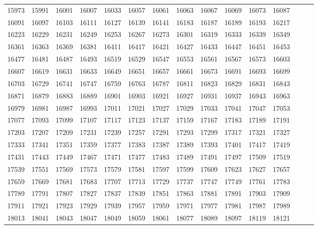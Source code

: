 \documentclass[10pt, a4paper]{article}
\begin{document}
\begin{center}
\begin{longtable}{c c c c c c c c c c c c c c c}
        15973 & 15991 & 16001 & 16007 & 16033 & 16057 & 16061 & 16063 & 16067 & 16069 & 16073 & 16087 \\
        16091 & 16097 & 16103 & 16111 & 16127 & 16139 & 16141 & 16183 & 16187 & 16189 & 16193 & 16217 \\
        16223 & 16229 & 16231 & 16249 & 16253 & 16267 & 16273 & 16301 & 16319 & 16333 & 16339 & 16349 \\
        16361 & 16363 & 16369 & 16381 & 16411 & 16417 & 16421 & 16427 & 16433 & 16447 & 16451 & 16453 \\
        16477 & 16481 & 16487 & 16493 & 16519 & 16529 & 16547 & 16553 & 16561 & 16567 & 16573 & 16603 \\
        16607 & 16619 & 16631 & 16633 & 16649 & 16651 & 16657 & 16661 & 16673 & 16691 & 16693 & 16699 \\
        16703 & 16729 & 16741 & 16747 & 16759 & 16763 & 16787 & 16811 & 16823 & 16829 & 16831 & 16843 \\
        16871 & 16879 & 16883 & 16889 & 16901 & 16903 & 16921 & 16927 & 16931 & 16937 & 16943 & 16963 \\
        16979 & 16981 & 16987 & 16993 & 17011 & 17021 & 17027 & 17029 & 17033 & 17041 & 17047 & 17053 \\
        17077 & 17093 & 17099 & 17107 & 17117 & 17123 & 17137 & 17159 & 17167 & 17183 & 17189 & 17191 \\
        17203 & 17207 & 17209 & 17231 & 17239 & 17257 & 17291 & 17293 & 17299 & 17317 & 17321 & 17327 \\
        17333 & 17341 & 17351 & 17359 & 17377 & 17383 & 17387 & 17389 & 17393 & 17401 & 17417 & 17419 \\
        17431 & 17443 & 17449 & 17467 & 17471 & 17477 & 17483 & 17489 & 17491 & 17497 & 17509 & 17519 \\
        17539 & 17551 & 17569 & 17573 & 17579 & 17581 & 17597 & 17599 & 17609 & 17623 & 17627 & 17657 \\
        17659 & 17669 & 17681 & 17683 & 17707 & 17713 & 17729 & 17737 & 17747 & 17749 & 17761 & 17783 \\
        17789 & 17791 & 17807 & 17827 & 17837 & 17839 & 17851 & 17863 & 17881 & 17891 & 17903 & 17909 \\
        17911 & 17921 & 17923 & 17929 & 17939 & 17957 & 17959 & 17971 & 17977 & 17981 & 17987 & 17989 \\
        18013 & 18041 & 18043 & 18047 & 18049 & 18059 & 18061 & 18077 & 18089 & 18097 & 18119 & 18121 \\

\end{longtable}
\end{center}
\end{document}
